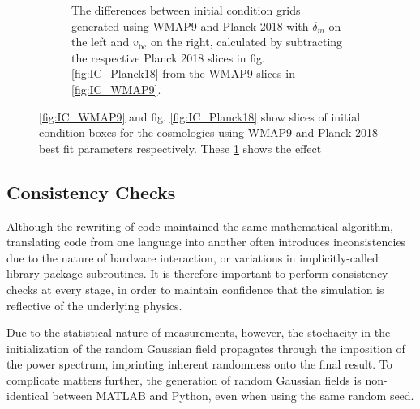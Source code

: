 \documentclass[floats,floatfix,showpacs,amssymb,prd,superscriptaddress,nofootinbib]{revtex4-2} %
\newcommand{\red}{\textcolor{red}}
\begin{document}
\begin{figure}
\begin{subfigure}[b]{0.9\textwidth}
         \caption{The differences between initial condition grids generated using WMAP9 and Planck 2018 with $\delta_m$ on the left and $v_{\text{bc}}$ on the right, calculated by subtracting the respective Planck 2018 slices in fig. \ref{fig:IC_Planck18} from the WMAP9 slices in \ref{fig:IC_WMAP9}.}
         \label{fig:IC_difference_WMAP9_Planck18}
     \end{subfigure}
        \caption{\ref{fig:IC_WMAP9} and fig. \ref{fig:IC_Planck18} show slices of initial condition boxes for the cosmologies using WMAP9 and Planck 2018 best fit parameters respectively. These \ref{fig:IC_difference_WMAP9_Planck18} shows the effect}
        \label{fig:IC_WMAP9_Planck18}
\end{figure}

\subsection{Consistency Checks}
Although the rewriting of code maintained the same mathematical algorithm, translating code from one language into another often introduces inconsistencies due to the nature of hardware interaction, or variations in implicitly-called library package subroutines. It is therefore important to perform consistency checks at every stage, in order to maintain confidence that the simulation is reflective of the underlying physics.

Due to the statistical nature of measurements, however, the stochacity in the initialization of the random Gaussian field propagates through the imposition of the power spectrum, imprinting inherent randomness onto the final result. To complicate matters further, the generation of random Gaussian fields is non-identical between MATLAB and Python, even when using the same random seed. 
\end{document}
